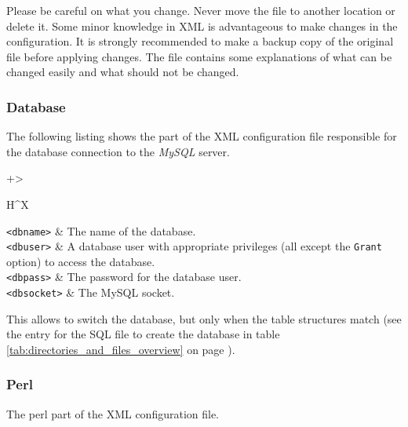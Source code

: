 \documentclass[a4paper,10pt,twoside,titlepage,headings=small,bibliography=totocnumbered,headsepline]{scrartcl}
\begin{document}
\begin{appendix}
Please be careful on what you change. Never move the file to another location or delete it. Some minor knowledge in XML is advantageous to make changes in the configuration. It is strongly recommended to make a backup copy of the original file before applying changes. The file contains some explanations of what can be changed easily and what should not be changed.

\numcodestyle
\lstset{language=XML}    

\subsubsection{Database}
\label{app:configdb}

The following listing shows the part of the XML configuration file responsible for the database connection to the \textit{MySQL} server. 




\begin{center} 
\renewcommand\arraystretch{2}
\begin{tabularx}{\textwidth}{+>{\raggedright\arraybackslash}H^X}
\lstinline|<dbname>|	&	The name of the database. \\ 
\lstinline|<dbuser>|	&	A database user with appropriate privileges (all except the \lstinline|Grant| option) to access the database. \\
\lstinline|<dbpass>|	&	The password for the database user. \\ 
\lstinline|<dbsocket>|	&	The MySQL socket. \\ 
\end{tabularx}
\label{tab:database_config}
\end{center}

This allows to switch the database, but only when the table structures match (see the entry for the SQL file to create the database in table \ref{tab:directories_and_files_overview} on page \pageref{tab:directories_and_files_overview}).

\pagebreak

\subsubsection{Perl}
\label{app:configperl}

The perl part of the XML configuration file.


\end{appendix}
\end{document}
